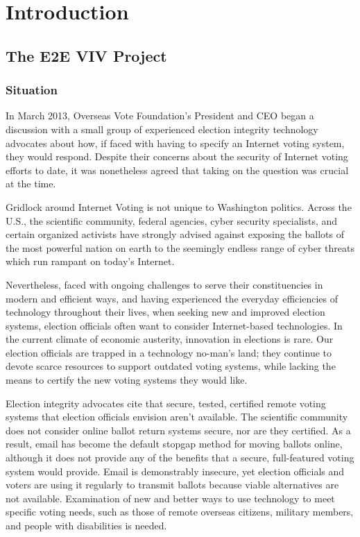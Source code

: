 \chapter{Introduction}
\label{chapter:introduction}

\section{The E2E VIV Project}
\label{sec:e2e-viv-project}

\subsection{Situation}
\label{sec:situation}

In March 2013, Overseas Vote Foundation’s President and CEO began a
discussion with a small group of experienced election integrity
technology advocates about how, if faced with having to specify an
Internet voting system, they would respond. Despite their concerns
about the security of Internet voting efforts to date, it was
nonetheless agreed that taking on the question was crucial at the
time.

Gridlock around Internet Voting is not unique to Washington
politics. Across the U.S., the scientific community, federal agencies,
cyber security specialists, and certain organized activists have
strongly advised against exposing the ballots of the most powerful
nation on earth to the seemingly endless range of cyber threats which
run rampant on today’s Internet.

Nevertheless, faced with ongoing challenges to serve their
constituencies in modern and efficient ways, and having experienced
the everyday efficiencies of technology throughout their lives, when
seeking new and improved election systems, election officials often
want to consider Internet-based technologies. In the current climate
of economic austerity, innovation in elections is rare. Our election
officials are trapped in a technology no-man’s land; they continue to
devote scarce resources to support outdated voting systems, while
lacking the means to certify the new voting systems they would like.

Election integrity advocates cite that secure, tested, certified
remote voting systems that election officials envision aren’t
available. The scientific community does not consider online ballot
return systems secure, nor are they certified. As a result, email has
become the default stopgap method for moving ballots online, although
it does not provide any of the benefits that a secure, full-featured
voting system would provide. Email is demonstrably insecure, yet
election officials and voters are using it regularly to transmit
ballots because viable alternatives are not available. Examination of
new and better ways to use technology to meet specific voting needs,
such as those of remote overseas citizens, military members, and
people with disabilities is needed.

